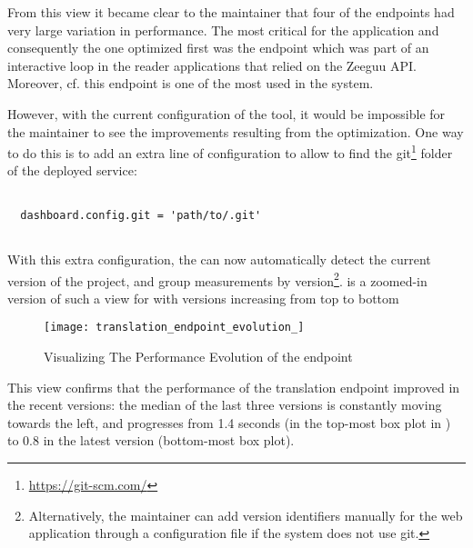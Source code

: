 \documentclass{sig-alternate-05-2015}
\begin{document}
  From this view it became clear to the maintainer that four of the endpoints had very large variation in performance.   The most critical for the application and consequently the one optimized first was the \epTranslations endpoint which was part of an interactive loop in the reader applications that relied on the Zeeguu API. Moreover, cf.  this endpoint is one of the most used in the system.


  \niceseparator


  However, with the current configuration of the tool, it would be impossible for the maintainer to see the improvements resulting from the optimization. One way to do this is to add an extra line of configuration to allow \tool to find the git\footnote{\url{https://git-scm.com/}} folder of the deployed service: 

%
%
%
    
    \begin{lstlisting}[style=custompython]
  
  dashboard.config.git = 'path/to/.git'
    
  \end{lstlisting}  
 
  With this extra configuration, the \tool can now automatically detect the current version of the project, and group measurements by version\footnote{Alternatively, the maintainer can add version identifiers manually for the web application through a configuration file if the system does not use git.}.  is a zoomed-in version of such a view for \epTranslations with versions increasing from top to bottom
  
  
    \begin{figure}[h!]
      \centering
      \texttt{[image: translation\_endpoint\_evolution\_]}
      \caption{Visualizing The Performance Evolution of the \epTranslations endpoint}
      \label{fig:tee}
    \end{figure}

  This view confirms that the performance of the translation endpoint improved in the recent versions: the median of the last three versions is constantly moving towards the left, and progresses from 1.4 seconds (in the top-most box plot in ) to 0.8 in the latest version (bottom-most box plot).
\end{document}
